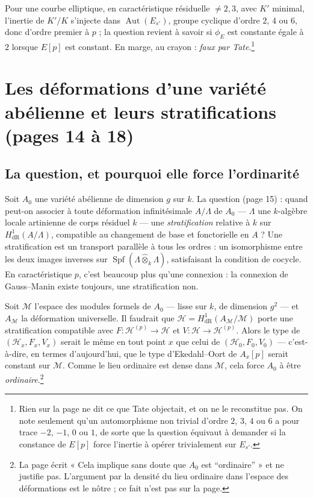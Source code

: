 \documentclass[11pt,a4paper]{article}
\begin{document}
Pour une courbe elliptique, en caractéristique résiduelle $\neq 2, 3$, avec
$K'$ minimal, l'inertie de $K'/K$ s'injecte dans $\operatorname{Aut}(E_{s'})$,
groupe cyclique d'ordre $2$, $4$ ou $6$, donc d'ordre premier à $p$ ; la
question revient à savoir si $\phi_E$ est constante égale à $2$ lorsque $E[p]$
est constant. En marge, au crayon : \emph{faux par Tate}.\footnote{Rien sur la
page ne dit ce que Tate objectait, et on ne le reconstitue pas. On note
seulement qu'un automorphisme non trivial d'ordre $2$, $3$, $4$ ou $6$ a pour
trace $-2$, $-1$, $0$ ou $1$, de sorte que la question équivaut à demander si
la constance de $E[p]$ force l'inertie à opérer trivialement sur $E_{s'}$.}

\section*{Les déformations d'une variété abélienne et leurs stratifications (pages 14 à 18)}

\subsection*{La question, et pourquoi elle force l'ordinarité}

Soit $A_0$ une variété abélienne de dimension $g$ sur $k$. La question
(page 15) : quand peut-on associer à toute déformation infinitésimale
$A/\Lambda$ de $A_0$ --- $\Lambda$ une $k$-algèbre locale artinienne de corps
résiduel $k$ --- une \emph{stratification} relative à $k$ sur
$H^1_{\mathrm{dR}}(A/\Lambda)$, compatible au changement de base et
fonctorielle en $A$ ? Une stratification est un transport parallèle à tous les
ordres : un isomorphisme entre les deux images inverses sur $\operatorname{Spf}
(\Lambda \hat\otimes_k \Lambda)$, satisfaisant la condition de cocycle. En
caractéristique $p$, c'est beaucoup plus qu'une connexion : la connexion de
Gauss--Manin existe toujours, une stratification non.

Soit $\mathcal{M}$ l'espace des modules formels de $A_0$ --- lisse sur $k$, de
dimension $g^2$ --- et $A_{\mathcal{M}}$ la déformation universelle. Il faudrait
que $\mathcal{H} = H^1_{\mathrm{dR}}(A_{\mathcal{M}}/\mathcal{M})$ porte une
stratification compatible avec $F : \mathcal{H}^{(p)} \to \mathcal{H}$ et $V :
\mathcal{H} \to \mathcal{H}^{(p)}$. Alors le type de $(\mathcal{H}_x, F_x, V_x)$
serait le même en tout point $x$ que celui de $(\mathcal{H}_0, F_0, V_0)$ ---
c'est-à-dire, en termes d'aujourd'hui, que le type d'Ekedahl--Oort de $A_x[p]$
serait constant sur $\mathcal{M}$. Comme le lieu ordinaire est dense dans
$\mathcal{M}$, cela force $A_0$ à être \emph{ordinaire}.\footnote{La page écrit
« Cela implique sans doute que $A_0$ est “ordinaire” » et ne justifie pas.
L'argument par la densité du lieu ordinaire dans l'espace des déformations
est le nôtre ; ce fait n'est pas sur la page.}
\end{document}
